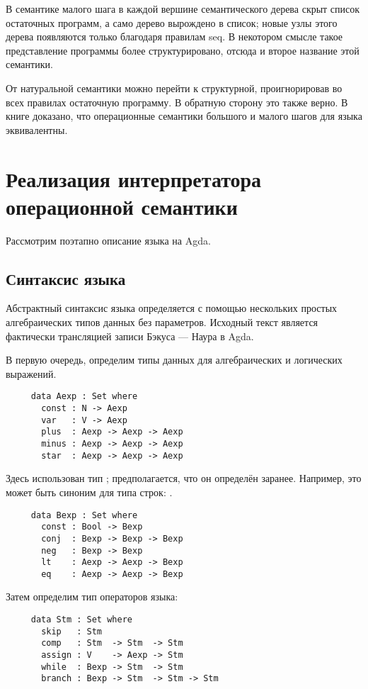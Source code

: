     В семантике малого шага в каждой вершине семантического дерева скрыт список остаточных программ, а само дерево вырождено в список; новые узлы этого дерева появляются только благодаря правилам seq. В некотором смысле такое представление программы более структурировано, отсюда и второе название этой семантики.

    От натуральной семантики можно перейти к структурной, проигнорировав во всех правилах остаточную программу. В обратную сторону это также верно. В книге\cite{Nielson:1992:SAF:129085} доказано, что операционные семантики большого и малого шагов для языка \KWhile \ccode{ }эквивалентны.

  \section{Реализация интерпретатора операционной семантики}

  Рассмотрим поэтапно описание языка \KWhile \ccode{ }на Agda.

  \subsection{Синтаксис языка \KWhile}
     Абстрактный синтаксис языка определяется с помощью нескольких простых алгебраических типов данных без параметров. Исходный текст является фактически трансляцией записи Бэкуса --- Наура в Agda.

     В первую очередь, определим типы данных для алгебраических и логических выражений.
     \begin{lstlisting}
     data Aexp : Set where
       const : N -> Aexp
       var   : V -> Aexp
       plus  : Aexp -> Aexp -> Aexp
       minus : Aexp -> Aexp -> Aexp
       star  : Aexp -> Aexp -> Aexp
     \end{lstlisting}

     Здесь использован тип ; предполагается, что он определён заранее. Например, это может быть синоним для типа строк: .

     \begin{lstlisting}
     data Bexp : Set where
       const : Bool -> Bexp
       conj  : Bexp -> Bexp -> Bexp
       neg   : Bexp -> Bexp
       lt    : Aexp -> Aexp -> Bexp
       eq    : Aexp -> Aexp -> Bexp
     \end{lstlisting}

     Затем определим тип операторов языка:
     \begin{lstlisting}
     data Stm : Set where
       skip   : Stm
       comp   : Stm  -> Stm  -> Stm
       assign : V    -> Aexp -> Stm
       while  : Bexp -> Stm  -> Stm
       branch : Bexp -> Stm  -> Stm -> Stm
     \end{lstlisting}

